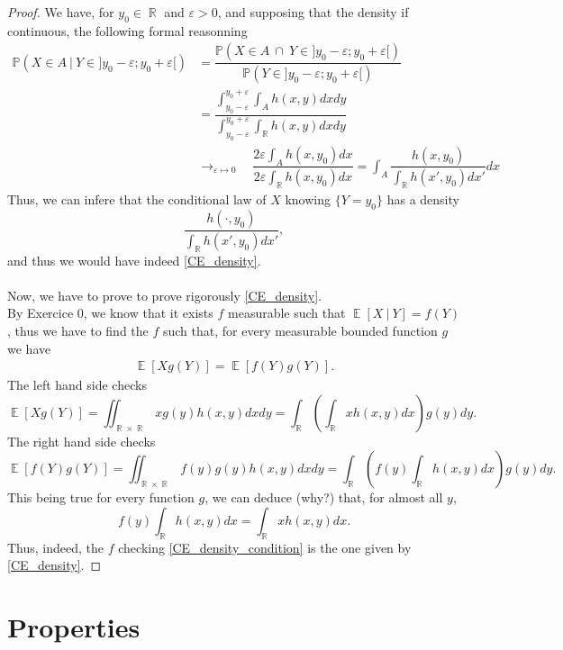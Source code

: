 \documentclass[10pt,a4paper]{article}
\theoremstyle{definition}
\numberwithin{equation}{section}
\DeclareMathOperator{\R}{\mathbb{R}}
\DeclareMathOperator{\E}{\mathbb{E}}
\begin{document}
\begin{proof}
We have, for $y_0\in\R$ and $\varepsilon>0$, and supposing that the density if continuous, the following formal reasonning
\begin{align*}
\mathbb{P}(X\in A~|~Y\in ]y_0-\varepsilon;y_0+\varepsilon[) &= \dfrac{\mathbb{P}(X\in A~\cap~Y\in ]y_0-\varepsilon;y_0+\varepsilon[)}{\mathbb{P}(Y\in ]y_0-\varepsilon;y_0+\varepsilon[)}\\
&= \dfrac{\int_{y_0-\varepsilon}^{y_0+\varepsilon}\int_A h(x,y)dxdy}{\int_{y_0-\varepsilon}^{y_0+\varepsilon}\int_{\R} h(x,y)dxdy}\\
& \longrightarrow_{\varepsilon\mapsto 0} \quad \dfrac{2\varepsilon\int_A h(x,y_0)dx}{2\varepsilon \int_{\R} h(x,y_0)dx} = \int_A \dfrac{ h(x,y_0)}{\int_{\R} h(x',y_0)dx'}dx
\end{align*}
Thus, we can infere that the conditional law of $X$ knowing $\{Y=y_0\}$ has a density 
$$\dfrac{ h(\cdot,y_0)}{\int_{\R} h(x',y_0)dx'},$$
and thus we would have indeed \eqref{CE_density}.\\
~\\
Now, we have to prove to prove rigorously \eqref{CE_density}.\\
By Exercice 0, we know that it exists $f$ measurable such that $\E[X~|~Y]=f(Y)$, thus we have to find the $f$ such that, for every measurable bounded function $g$ we have 
\begin{align}
\label{CE_density_condition}
\E[Xg(Y)]=\E[f(Y)g(Y)].
\end{align}
The left hand side checks
$$\E[Xg(Y)] = \iint_{\R\times\R} xg(y) h(x,y) dxdy = \int_{\R}\left(\int_{\R}xh(x,y)dx\right)g(y)dy.$$
The right hand side checks
$$\E[f(Y)g(Y)] = \iint_{\R\times\R} f(y)g(y) h(x,y) dxdy = \int_{\R}\left(f(y)\int_{\R}h(x,y)dx\right)g(y)dy.$$
This being true for every function $g$, we can deduce (why?) that, for almost all $y$,
$$f(y)\int_{\R}h(x,y)dx = \int_{\R}xh(x,y)dx.$$
Thus, indeed, the $f$ checking \eqref{CE_density_condition} is the one given by \eqref{CE_density}.
\end{proof}


\section{Properties}
\end{document}
